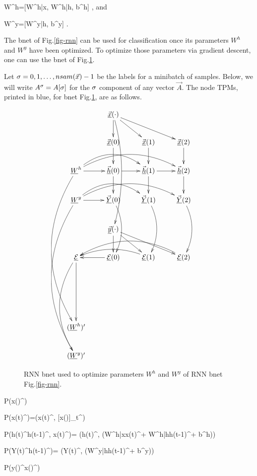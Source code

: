 \beq
W^h=[W^{h|x}, W^{h|h}, b^h]
\;,
\eeq
and

\beq
W^y=[W^{y|h}, b^y]
\;.
\eeq

The bnet of Fig.\ref{fig-rnn}
can be used for
classification once 
its parameters 
$W^h$ and $W^y$
have been optimized.
To optimize
those parameters via gradient
descent,
one can use the bnet 
of Fig.\ref{fig-rnn-ext}.

Let $\sigma=0,1, \ldots, nsam({\vec{x}})-1$
be the labels for a minibatch of samples.
Below, we will write $A^\sigma=A[\sigma]$
for the $\sigma$
component of any vector $\vec{A}$.
The node TPMs,
 printed in blue,
for bnet Fig.\ref{fig-rnn-ext},
 are as follows.



\begin{figure}[h!]
\centering
$$\xymatrix{
&\ranvec{x}(\cdot)\ar[d]\ar[dr]\ar[drr]
\ar@/^1pc/[dddd]
\\
&\vec{\rvx}(0)\ar[d]&
\vec{\rvx}(1)\ar[d]&
\vec{\rvx}(2)\ar[d]\\
\rvW^h\ar[r]\ar@/^2pc/[rr]\ar@/^2pc/[rrr]
\ar@/_3pc/[dddddd]
&\vec{\rvh}(0)\ar[d]\ar[r]&
\vec{\rvh}(1)\ar[d]\ar[r]&
\vec{\rvh}(2)\ar[d]\\
\rvW^y\ar[r]\ar@/^2pc/[rr]\ar@/^2pc/[rrr]
\ar@/_3pc/[dddddd]
&\vec{\rvY}(0)\ar@/^1pc/[dd]&
\vec{\rvY}(1)\ar@/^1pc/[dd]&
\vec{\rvY}(2)\ar@/^1pc/[dd]
\\
&
\ranvec{y}(\cdot)\ar[d]\ar[dr]\ar[drr]
\\
\ul{\cale}\ar[ddd]
\ar@/_2pc/[dddd]&
\ul{\cale}(0)\ar[l]&
\ul{\cale}(1)\ar@/_1pc/[ll]&
\ul{\cale}(2)\ar@/_2pc/[lll]
\\
\\
\\
(\rvW^h)'\\
(\rvW^y)'
}
$$
\caption{RNN bnet used
to optimize parameters $W^h$
and $W^y$ of RNN bnet Fig.\ref{fig-rnn}.}
\label{fig-rnn-ext}
\end{figure}

\beq\color{blue}
P(x(\cdot)^\s)
\eeq

\beq\color{blue}
P(x(t)^\s)=\delta(x(t)^\s,
[x(\cdot)]_t^\s)
\eeq

\beq\color{blue}
P(h(t)^\s\cond h(t-1)^\s, x(t)^\s)=
\delta(h(t)^\s,
\cala(W^{h|x}x(t)^\s + W^{h|h}h(t-1)^\s + b^h))
\eeq

\beq\color{blue}
P(Y(t)^\s\cond h(t-1)^\s)=
\delta(Y(t)^\s,
\cala(W^{y|h}h(t-1)^\s + b^y))
\eeq

\beq\color{blue}
P(y(\cdot)^\s\cond x(\cdot)^\s)
\eeq

